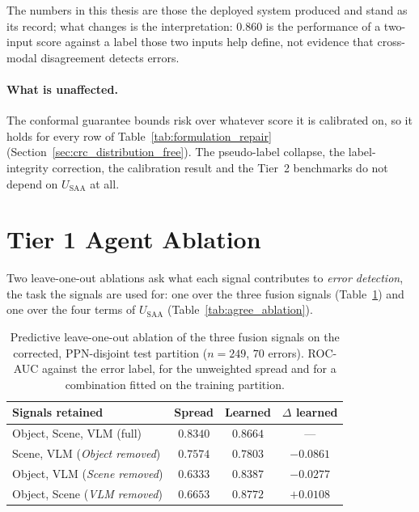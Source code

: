 \documentclass[12pt,a4paper]{report}
\begin{document}
The numbers in this thesis are those the deployed system produced and stand as its record; what changes is the interpretation: $0.860$ is the performance of a two-input score against a label those two inputs help define, not evidence that cross-modal disagreement detects errors.

\paragraph{What is unaffected.} The conformal guarantee bounds risk over whatever score it is
calibrated on, so it holds for every row of Table~\ref{tab:formulation_repair} (Section~\ref{sec:crc_distribution_free}). The pseudo-label collapse, the label-integrity correction,
the calibration result and the Tier~2 benchmarks do not depend on $U_{\text{SAA}}$ at all.

\section{Tier 1 Agent Ablation}
\label{sec:tier1_ablation}
Two leave-one-out ablations ask what each signal contributes to \emph{error detection}, the task the signals are used for: one over the three fusion signals (Table~\ref{tab:predictive_ablation}) and one over the four terms of $U_{\text{SAA}}$ (Table~\ref{tab:agree_ablation}).

\begin{table}[!htbp]
\centering
\caption[Predictive leave-one-out ablation of the three fusion signals]{Predictive leave-one-out ablation of the three fusion signals on the corrected, PPN-disjoint test partition ($n=249$, $70$ errors). ROC-AUC against the error label, for the unweighted spread and for a combination fitted on the training partition.}
\label{tab:predictive_ablation}
\small
\begin{tabular}{@{}l c c c@{}}
\toprule
\textbf{Signals retained} & \textbf{Spread} & \textbf{Learned} & \textbf{$\Delta$ learned} \\
\midrule
Object, Scene, VLM (full) & $0.8340$ & $0.8664$ & --- \\
Scene, VLM \quad(\emph{Object removed}) & $0.7574$ & $0.7803$ & $-0.0861$ \\
Object, VLM \quad(\emph{Scene removed}) & $0.6333$ & $0.8387$ & $-0.0277$ \\
Object, Scene \quad(\emph{VLM removed}) & $0.6653$ & $\mathbf{0.8772}$ & $\mathbf{+0.0108}$ \\
\bottomrule
\end{tabular}
\end{table}
\end{document}

